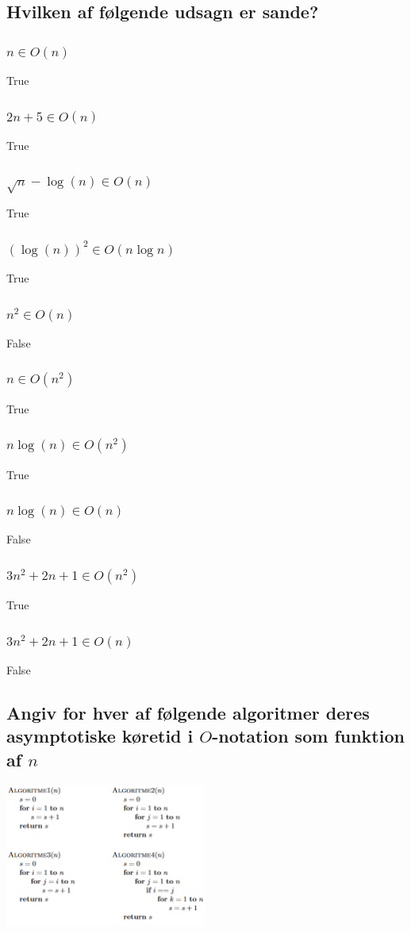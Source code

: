 \documentclass[12pt, a4paper]{article}
\begin{document}
		\subsection{Hvilken af følgende udsagn er sande?}
			\subsubsection{$n\in O(n)$}
				True
			\subsubsection{$2n+5\in O(n)$}
				True
			\subsubsection{$\sqrt{n}-\log(n)\in O(n)$}
				True
			\subsubsection{$(\log(n))^2\in O(n\log n)$}
				True
			\subsubsection{$n^2 \in O(n)$}
				False
			\subsubsection{$n\in O(n^2)$}
				True
			\subsubsection{$n\log(n)\in O(n^2)$}
				True
			\subsubsection{$n\log(n)\in O(n)$}
				False
			\subsubsection{$3n^2+2n+1\in O(n^2)$}
				True
			\subsubsection{$3n^2+2n+1\in O(n)$}
				False
		\subsection{Angiv for hver af følgende algoritmer deres asymptotiske køretid i $O$-notation som funktion af $n$}
			\begin{center}
				\includegraphics[width=250px]{images/40.5Algoritmer.png}
			\end{center}
\end{document}
